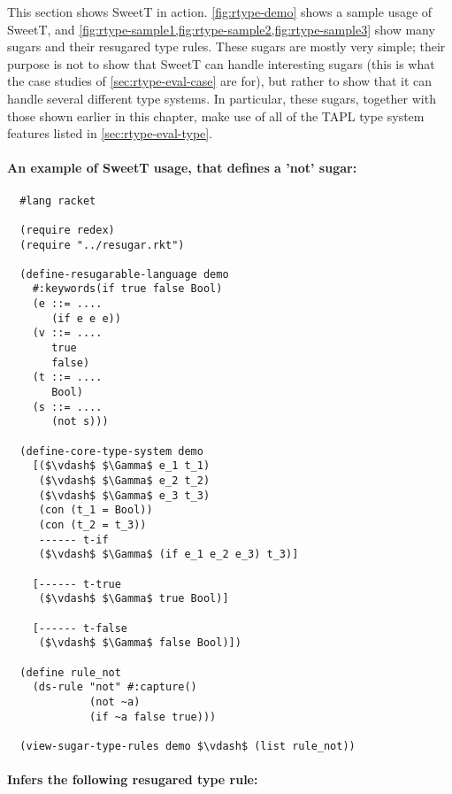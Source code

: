 This section shows SweetT in action. \cref{fig:rtype-demo} shows a sample
usage of SweetT, and \cref{fig:rtype-sample1,fig:rtype-sample2,fig:rtype-sample3} show
many sugars and their resugared type rules. These sugars are mostly
very simple; their purpose is not to show that SweetT can handle
interesting sugars (this is what the case studies of
\cref{sec:rtype-eval-case} are for), but rather to show that it can handle
several different type systems. In particular, these sugars, together
with those shown earlier in this chapter, make use of all of the TAPL type
system features listed in \cref{sec:rtype-eval-type}.
\begin{figure*}[h]
\paragraph{An example of SweetT usage, that defines a 'not' sugar:}
\begin{lstlisting}
  #lang racket

  (require redex)
  (require "../resugar.rkt")
  
  (define-resugarable-language demo
    #:keywords(if true false Bool)
    (e ::= ....
       (if e e e))
    (v ::= ....
       true
       false)
    (t ::= ....
       Bool)
    (s ::= ....
       (not s)))
  
  (define-core-type-system demo
    [($\vdash$ $\Gamma$ e_1 t_1)
     ($\vdash$ $\Gamma$ e_2 t_2)
     ($\vdash$ $\Gamma$ e_3 t_3)
     (con (t_1 = Bool))
     (con (t_2 = t_3))
     ------ t-if
     ($\vdash$ $\Gamma$ (if e_1 e_2 e_3) t_3)]
  
    [------ t-true
     ($\vdash$ $\Gamma$ true Bool)]
  
    [------ t-false
     ($\vdash$ $\Gamma$ false Bool)])
  
  (define rule_not
    (ds-rule "not" #:capture()
             (not ~a)
             (if ~a false true)))
  
  (view-sugar-type-rules demo $\vdash$ (list rule_not))
\end{lstlisting}
\paragraph{Infers the following resugared type rule:}

\caption{Sample SweetT usage}\label{fig:rtype-demo}
\end{figure*}



